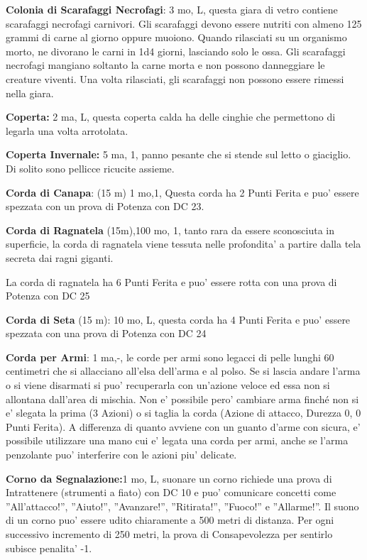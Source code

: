 \documentclass[a4paper,11pt,twoside,openany]{book}
\begin{document}
{\textbf{Colonia di Scarafaggi Necrofagi}: 3 mo, L, questa giara di vetro contiene scarafaggi necrofagi carnivori. Gli scarafaggi devono essere nutriti con almeno 125 grammi di carne al giorno oppure muoiono. Quando rilasciati su un organismo morto, ne divorano le carni in 1d4 giorni, lasciando solo le ossa. Gli scarafaggi necrofagi mangiano soltanto la carne morta e non possono danneggiare le creature viventi. Una volta rilasciati, gli scarafaggi non possono essere rimessi nella giara.

\textbf{Coperta:} 2 ma, L, questa coperta calda ha delle cinghie che permettono di legarla una volta arrotolata.

\textbf{Coperta Invernale:} 5 ma, 1, panno pesante che si stende sul letto o giaciglio. Di solito sono pellicce ricucite assieme.

\textbf{Corda di Canapa}: (15 m) 1 mo,1, Questa corda ha 2 Punti Ferita e puo' essere spezzata con un prova di Potenza con DC 23.

\textbf{Corda di Ragnatela} (15m),100 mo, 1, tanto rara da essere sconosciuta in superficie, la corda di ragnatela viene tessuta nelle profondita’ a partire dalla tela secreta dai ragni giganti.

La corda di ragnatela ha 6 Punti Ferita e puo' essere rotta con una prova di Potenza con DC 25

\textbf{Corda di Seta} (15 m): 10 mo, L, questa corda ha 4 Punti Ferita e puo' essere spezzata con una prova di Potenza con DC 24

\textbf{Corda per Armi}: 1 ma,-, le corde per armi sono legacci di pelle lunghi 60 centimetri che si allacciano all’elsa dell’arma e al polso. Se si lascia andare l’arma o si viene disarmati si puo' recuperarla con un’azione veloce ed essa non si allontana dall’area di mischia. Non e' possibile pero' cambiare arma finché non si e' slegata la prima (3 Azioni) o si taglia la corda (Azione di attacco, Durezza 0, 0 Punti Ferita). A differenza di quanto avviene con un guanto d’arme con sicura, e' possibile utilizzare una mano cui e' legata una corda per armi, anche se l’arma penzolante puo' interferire con le azioni piu' delicate.

\textbf{Corno da Segnalazione:}1 mo, L, suonare un corno richiede una prova di Intrattenere (strumenti a fiato) con DC 10 e puo' comunicare concetti come ''All'attacco!'', ''Aiuto!'', ''Avanzare!'', ''Ritirata!'', ''Fuoco!'' e ''Allarme!''. Il suono di un corno puo' essere udito chiaramente a 500 metri di distanza. Per ogni successivo incremento di 250 metri, la prova di Consapevolezza per sentirlo subisce penalita' -1.

}
\end{document}
